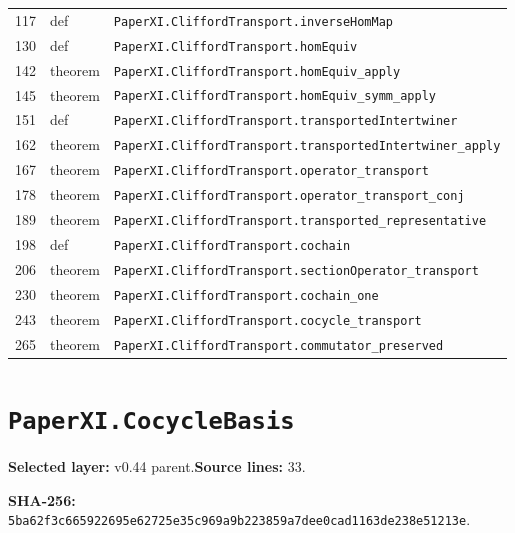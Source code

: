 \documentclass[10pt,oneside]{book}
\begin{document}
\begin{longtable}{@{}p{}p{}p{}@{}}
117&def&\nolinkurl{PaperXI.CliffordTransport.inverseHomMap}\\

130&def&\nolinkurl{PaperXI.CliffordTransport.homEquiv}\\

142&theorem&\nolinkurl{PaperXI.CliffordTransport.homEquiv_apply}\\

145&theorem&\nolinkurl{PaperXI.CliffordTransport.homEquiv_symm_apply}\\

151&def&\nolinkurl{PaperXI.CliffordTransport.transportedIntertwiner}\\

162&theorem&\nolinkurl{PaperXI.CliffordTransport.transportedIntertwiner_apply}\\

167&theorem&\nolinkurl{PaperXI.CliffordTransport.operator_transport}\\

178&theorem&\nolinkurl{PaperXI.CliffordTransport.operator_transport_conj}\\

189&theorem&\nolinkurl{PaperXI.CliffordTransport.transported_representative}\\

198&def&\nolinkurl{PaperXI.CliffordTransport.cochain}\\

206&theorem&\nolinkurl{PaperXI.CliffordTransport.sectionOperator_transport}\\

230&theorem&\nolinkurl{PaperXI.CliffordTransport.cochain_one}\\

243&theorem&\nolinkurl{PaperXI.CliffordTransport.cocycle_transport}\\

265&theorem&\nolinkurl{PaperXI.CliffordTransport.commutator_preserved}\\

\bottomrule\end{longtable}

\section{\texorpdfstring{\nolinkurl{PaperXI.CocycleBasis}}{PaperXI.CocycleBasis}}\label{module:PaperXI.CocycleBasis}

\textbf{Selected layer:} v0.44 parent.\quad\textbf{Source lines:} 33.\par\textbf{SHA-256:} {\scriptsize\nolinkurl{5ba62f3c665922695e62725e35c969a9b223859a7dee0cad1163de238e51213e}}.
\end{document}
